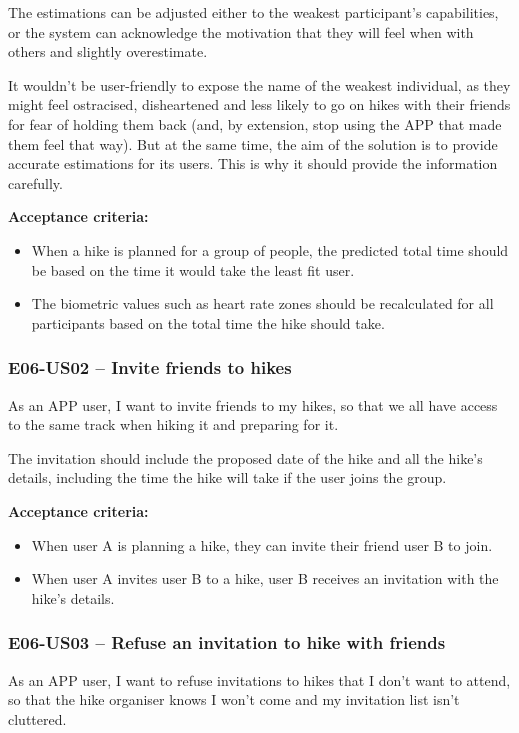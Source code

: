 The estimations can be adjusted either to the weakest participant's capabilities, or the system can acknowledge the motivation that they will feel when with others and slightly overestimate.

It wouldn't be user-friendly to expose the name of the weakest individual, as they might feel ostracised, disheartened and less likely to go on hikes with their friends for fear of holding them back
(and, by extension, stop using the APP that made them feel that way).
But at the same time, the aim of the solution is to provide accurate estimations for its users.
This is why it should provide the information carefully.

\textbf{Acceptance criteria:}
\begin{itemize}
    \item When a hike is planned for a group of people, the predicted total time should be based on the time it would take the least fit user.
    \item The biometric values such as heart rate zones should be recalculated for all participants based on the total time the hike should take.
\end{itemize}


\subsubsection*{E06-US02 -- Invite friends to hikes}
As an APP user, I want to invite friends to my hikes, so that we all have access to the same track when hiking it and preparing for it.

The invitation should include the proposed date of the hike and all the hike's details, including the time the hike will take if the user joins the group.

\textbf{Acceptance criteria:}
\begin{itemize}
    \item When user A is planning a hike, they can invite their friend user B to join. 
    \item When user A invites user B to a hike, user B receives an invitation with the hike's details.
\end{itemize}

\subsubsection*{E06-US03 -- Refuse an invitation to hike with friends}
As an APP user, I want to refuse invitations to hikes that I don't want to attend, so that the hike organiser knows I won't come and my invitation list isn't cluttered.

